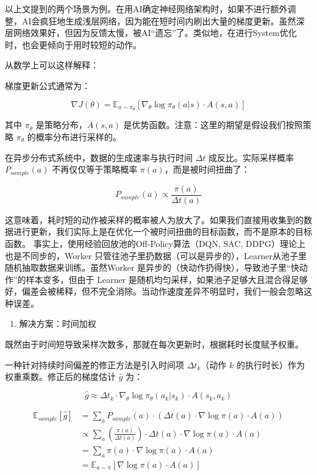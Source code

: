 以上文提到的两个场景为例。在用AI确定神经网络架构时，如果不进行额外调整，AI会疯狂地生成浅层网络，因为能在短时间内刷出大量的梯度更新。虽然深层网络效果好，但因为反馈太慢，被AI``遗忘''了。类似地，在进行System优化时，也会更倾向于用时较短的动作。

从数学上可以这样解释：

梯度更新公式通常为：

\[
\nabla J(\theta)=\mathbb{E}_{a\sim\pi_\theta}\left[\nabla_\theta\log\pi_\theta(a|s)\cdot A(s,a)\right]
\]

其中 \(\pi_\theta\) 是策略分布，\(A(s,a)\) 是优势函数。注意：这里的期望是假设我们按照策略 \(\pi_\theta\) 的概率分布进行采样的。

在异步分布式系统中，数据的生成速率与执行时间 \(\Delta t\) 成反比。实际采样概率 \(P_{sample}(a)\) 不再仅仅等于策略概率 \(\pi(a)\)，而是被时间扭曲了：

\[
P_{sample}(a)\propto \frac{\pi(a)}{\Delta t(a)}
\]

这意味着，耗时短的动作被采样的概率被人为放大了。如果我们直接用收集到的数据进行更新，我们实际上是在优化一个被时间扭曲的目标函数，而不是原本的目标函数。
事实上，使用经验回放池的Off-Policy算法（DQN, SAC, DDPG）理论上也是不同步的，Worker 只管往池子里扔数据（可以是异步的），Learner从池子里随机抽取数据来训练。虽然Worker 是异步的（快动作扔得快），导致池子里``快动作''的样本变多，但由于 Learner 是随机均匀采样，如果池子足够大且混合得足够好，偏差会被稀释，但不完全消除。当动作速度差异不明显时，我们一般会忽略这种误差。

\begin{enumerate}
\def\labelenumi{\arabic{enumi}.}
\setcounter{enumi}{1}
\tightlist
\item
  解决方案：时间加权
\end{enumerate}

既然由于时间短导致采样次数多，那就在每次更新时，根据耗时长度赋予权重。

一种针对持续时间偏差的修正方法是引入时间项 \(\Delta t_k\)（动作 \(k\) 的执行时长）作为权重乘数。修正后的梯度估计 \(\hat{g}\) 为：

\[
\hat{g}\approx \Delta t_k\cdot \nabla_\theta\log\pi_\theta(a_k|s_k)\cdot A(s_k,a_k)
\]

\[
\begin{aligned}
\mathbb{E}_{sample}[\hat{g}]
&= \sum_a P_{sample}(a)\cdot\left(\Delta t(a)\cdot\nabla\log\pi(a)\cdot A(a)\right)\\
&\propto \sum_a \left(\frac{\pi(a)}{\Delta t(a)}\right)\cdot\Delta t(a)\cdot\nabla\log\pi(a)\cdot A(a)\\
&= \sum_a \pi(a)\cdot\nabla\log\pi(a)\cdot A(a)\\
&= \mathbb{E}_{a\sim\pi}\left[\nabla\log\pi(a)\cdot A(a)\right]
\end{aligned}
\]

